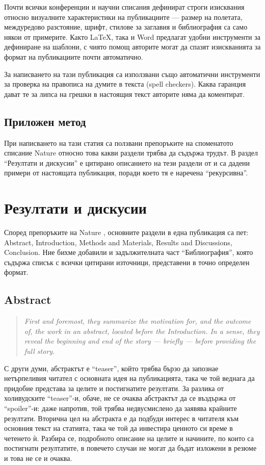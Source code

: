 \documentclass[11pt, oneside]{article}     %
\newenvironment{quotenature}{\begin{quote}\itshape}{\cite{nature}\end{quote}}
\begin{document}
Почти всички конференции и научни списания дефинират строги изисквания относно визуалните характеристики на публикациите --- размер на полетата, междуредово разстояние, шрифт, стилове за заглавия и библиография са само някои от примерите. Както \LaTeX, така и Word предлагат удобни инструменти за дефиниране на шаблони, с чиято помощ авторите могат да спазят изискванията за формат на публикациите почти автоматично.

За написването на тази публикация са използвани също автоматични инструменти за проверка на правописа на думите в текста (spell checkers). Каква гаранция дават те за липса на грешки в настоящия текст авторите няма да коментират.

\subsection*{Приложен метод}

При написването на тази статия са ползвани препоръките на споменатото списание Nature \cite{nature} относно това какви раздели трябва да съдържа трудът. В раздел ``Резултати и дискусии'' е цитирано описанието на тези раздели от \cite{nature} и са дадени примери от настоящата публикация, поради което тя е наречена ``рекурсивна''.

\section {Резултати и дискусии}

Според препоръките на Nature \cite{nature}, основните раздели в една публикация са пет: Abstract, Introduction, Methods and Materials, Results and Discussions, Conclusion. Ние бихме добавили и задължителната част ``Библиография'', която съдържа списък с всички цитирани източници, представени в точно определен формат.

\subsection*{Abstract}

\begin{quotenature}
  First and foremost, they summarize the motivation for, and the outcome of, the work in an abstract, located before the Introduction. In a sense, they reveal the beginning and end of the story — briefly — before providing the full story.
\end{quotenature}

С други думи, абстрактът е ``teaser'', който трябва бързо да запознае нетърпеливия читател с основната идея на публикацията, така че той веднага да придобие представа за целите и постигнатите резултати. За разлика от холивудските ``teaser''-и, обаче, не се очаква абстрактът да се въздържа от ``spoiler''-и: даже напротив, той трябва недвусмислено да заявява крайните резултати. Вторична цел на абстракта е да подбуди интерес в читателя към основния текст на статията, така че той да инвестира ценното си време в четенето ѝ. Разбира се, подробното описание на целите и начините, по които са постигнати резултатите, в повечето случаи не могат да бъдат изложени в резюме и това не се и очаква.
\end{document}
